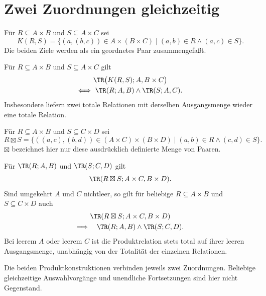 \section{Zwei Zuordnungen gleichzeitig}

\begin{definition}
Für $R\subseteq A\times B$ und $S\subseteq A\times C$ sei
\[
 K(R,S)=
 \{(a,(b,c))\in A\times(B\times C)\mid
                    (a,b)\in R\land(a,c)\in S\}.
\]
Die beiden Ziele werden als ein geordnetes Paar zusammengefaßt.
\end{definition}

\begin{theorem}
\label{b04guide:thm:coupling}
Für $R\subseteq A\times B$ und $S\subseteq A\times C$ gilt
\[
 \begin{gathered}
 \TR\bigl(K(R,S);A,B\times C\bigr)\\
 \Longleftrightarrow\
             \TR(R;A,B)\land\TR(S;A,C).
 \end{gathered}
\]
Insbesondere liefern zwei totale Relationen mit derselben
Ausgangsmenge wieder eine totale Relation.
\end{theorem}

\begin{definition}
Für $R\subseteq A\times B$ und $S\subseteq C\times D$ sei
\[
 R\boxtimes S=
 \{((a,c),(b,d))\in(A\times C)\times(B\times D)
             \mid(a,b)\in R\land(c,d)\in S\}.
\]
$\boxtimes$ bezeichnet hier nur diese ausdrücklich definierte
Menge von Paaren.
\end{definition}

\begin{theorem}
\label{b04guide:thm:product}
Für $\TR(R;A,B)$ und $\TR(S;C,D)$ gilt
\[
 \TR(R\boxtimes S;A\times C,B\times D).
\]
Sind umgekehrt $A$ und $C$ nichtleer, so gilt für beliebige
$R\subseteq A\times B$ und $S\subseteq C\times D$ auch
\[
 \begin{gathered}
 \TR(R\boxtimes S;A\times C,B\times D)\\
 \Longrightarrow\quad\TR(R;A,B)\land\TR(S;C,D).
 \end{gathered}
\]
Bei leerem $A$ oder leerem $C$ ist die Produktrelation stets
total auf ihrer leeren Ausgangsmenge, unabhängig von der
Totalität der einzelnen Relationen.
\end{theorem}

Die beiden Produktkonstruktionen verbinden jeweils zwei
Zuordnungen. Beliebige gleichzeitige Auswahlvorgänge und
unendliche Fortsetzungen sind hier nicht Gegenstand.
